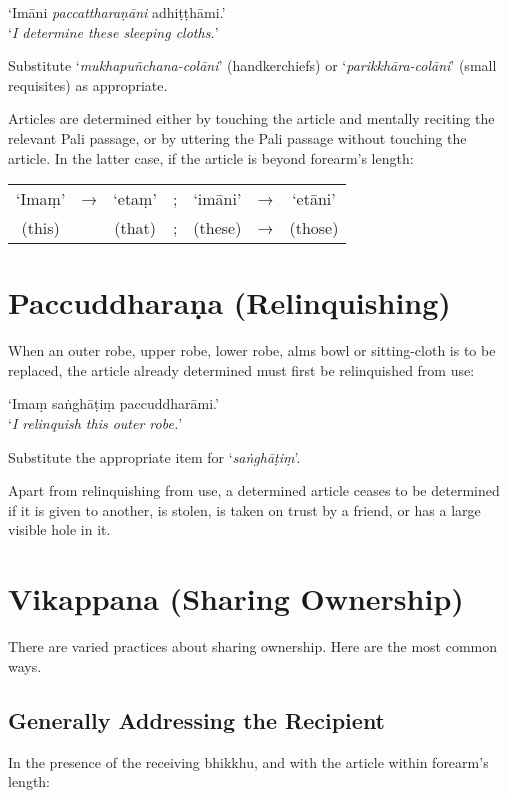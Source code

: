 ‘Imāni \emph{paccattharaṇāni} adhiṭṭhāmi.’\\
‘\emph{I determine these sleeping cloths.}’

Substitute ‘\emph{mukhapuñchana-colāni}’ (handkerchiefs) or
‘\emph{parikkhāra-colāni}’ (small requisites) as appropriate.

Articles are determined either by touching the article and mentally reciting the
relevant Pali passage, or by uttering the Pali passage without touching the
article. In the latter case, if the article is beyond forearm's length:

\begin{tabular}{c c c c c c c}
‘Imaṃ’ & → & ‘etaṃ’ & ; & ‘imāni’ & → & ‘etāni’\\
(this) &   & (that) & ; & (these) & → & (those)\\
\end{tabular}


\section{Paccuddharaṇa (Relinquishing)}

When an outer robe, upper robe, lower robe, alms bowl or sitting-cloth is to be
replaced, the article already determined must first be relinquished from use:

‘Imaṃ saṅghāṭiṃ paccuddharāmi.’\\
‘\emph{I relinquish this outer robe.}’ 

Substitute the appropriate item for ‘\emph{saṅghāṭiṃ}’.

Apart from relinquishing from use, a determined article ceases to be determined
if it is given to another, is stolen, is taken on trust by a friend, or has a
large visible hole in it.

\section{Vikappana (Sharing Ownership)}

There are varied practices about sharing ownership. Here are the most common
ways.

\subsection{Generally Addressing the Recipient}
\label{general-address}

In the presence of the receiving bhikkhu, and with the article within forearm's length:

